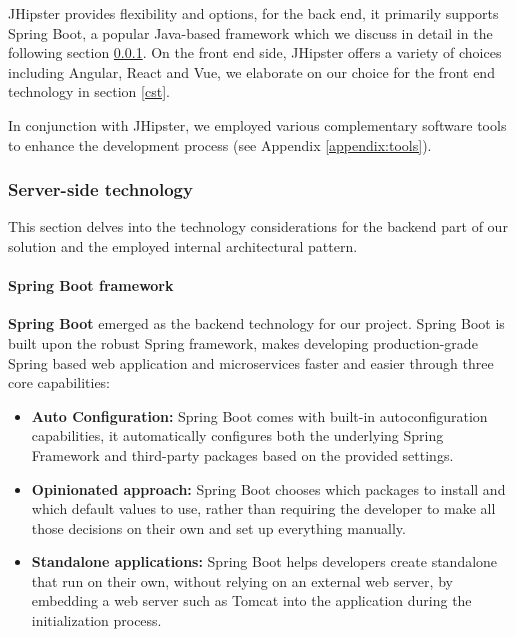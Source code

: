 JHipster provides flexibility and options, for the back end, it primarily supports Spring Boot,
a popular Java-based framework which we discuss in detail in the following section \ref{sst}. On the front end
side, JHipster offers a variety of choices including Angular, React and Vue, we elaborate on our choice for
the front end technology in section \ref{cst}.

In conjunction with JHipster, we employed various complementary software tools to enhance
the development process (see Appendix \ref{appendix:tools}).

\subsubsection{Server-side technology}
\label{sst}
This section delves into the technology considerations for the backend part of our solution and the
employed internal architectural pattern.

\paragraph{Spring Boot framework} \mbox{} \newline \newline
\textbf{Spring Boot} emerged as the backend technology for our project.
Spring Boot is built upon the robust Spring framework, makes developing production-grade Spring based
web application and microservices faster and easier through three core capabilities:

\begin{itemize}
      \item \textbf{Auto Configuration:} Spring Boot comes with built-in autoconfiguration capabilities,
            it automatically configures both the underlying Spring Framework and third-party packages based
            on the provided settings.
      \item \textbf{Opinionated approach:}  Spring Boot chooses which packages to install and which default
            values to use, rather than requiring the developer to make all those decisions on their own and set
            up everything manually.
      \item \textbf{Standalone applications:} Spring Boot helps developers create standalone
            that run on their own, without relying on an external web server, by embedding a web server such as
            Tomcat into the application during the initialization process.
\end{itemize}

